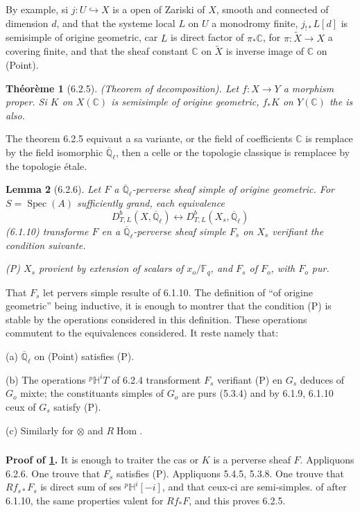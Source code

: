 \documentclass[12pt,a4paper]{article}
\theoremstyle{plain}
\newtheorem{theorem}{Th\'eor\`eme}[section]
\newtheorem{lemma}[theorem]{Lemma}
\theoremstyle{definition}
\theoremstyle{remark}
\DeclareMathOperator{\Hom}{Hom}
\DeclareMathOperator{\Spec}{Spec}
\newcommand{\CC}{\mathbb{C}}
\newcommand{\FF}{\mathbb{F}}
\newcommand{\HH}{\mathbb{H}}
\newcommand{\QQ}{\mathbb{Q}}
\begin{document}
By example, si $j: U \hookrightarrow X$ is a open of Zariski of $X$, smooth and connected of dimension $d$, and that the systeme local $L$ on $U$ a monodromy finite, $j_{!*}L[d]$ is semisimple of origine geometric, car $L$ is direct factor of $\pi_*\CC$, for $\pi: \tilde{X} \to X$ a covering finite, and that the sheaf constant $\CC$ on $\tilde{X}$ is inverse image of $\CC$ on (Point).

\begin{theorem}[6.2.5]\label{thm:6.2.5}(Theorem of decomposition).
Let $f: X \to Y$ a morphism proper. Si $K$ on $X(\CC)$ is semisimple of origine geometric, $f_*K$ on $Y(\CC)$ the is also.
\end{theorem}

The theorem 6.2.5 equivaut a sa variante, or the field of coefficients $\CC$ is remplace by the field isomorphic $\overline{\QQ}_{\ell}$, then a celle or the topologie classique is remplacee by the topologie étale.

\begin{lemma}[6.2.6]
Let $F$ a $\overline{\QQ}_{\ell}$-perverse sheaf simple of origine geometric. For $S = \Spec(A)$ sufficiently grand, each equivalence
\[
D^b_{T, L}(X, \overline{\QQ}_{\ell}) \longleftrightarrow D^b_{T, L}(X_s, \overline{\QQ}_{\ell})
\]
(6.1.10) transforme $F$ en a $\overline{\QQ}_{\ell}$-perverse sheaf simple $F_s$ on $X_s$ verifiant the condition suivante.

\emph{(P)} $X_s$ provient by extension of scalars of $x_o/\FF_q$, and $F_s$ of $F_o$, with $F_o$ pur.
\end{lemma}

That $F_s$ let pervers simple resulte of 6.1.10. The definition of ``of origine geometric'' being inductive, it is enough to montrer that the condition (P) is stable by the operations considered in this definition. These operations commutent to the equivalences considered. It reste namely that:

(a) $\overline{\QQ}_{\ell}$ on (Point) satisfies (P).

(b) The operations ${}^{p}\HH^iT$ of 6.2.4 transforment $F_s$ verifiant (P) en $G_s$ deduces of $G_o$ mixte; the constituants simples of $G_o$ are purs (5.3.4) and by 6.1.9, 6.1.10 ceux of $G_s$ satisfy (P).

(c) Similarly for $\otimes$ and $R\Hom$.

\subsubsection{}
\textbf{Proof of \ref{thm:6.2.5}.} It is enough to traiter the cas or $K$ is a perverse sheaf $F$. Appliquons 6.2.6. One trouve that $F_s$ satisfies (P). Appliquons 5.4.5, 5.3.8. One trouve that $Rf_{s*}F_s$ is direct sum of ses ${}^{p}\HH^i[-i]$, and that ceux-ci are semi-simples. of after 6.1.10, the same properties valent for $Rf_*F$, and this proves 6.2.5.
\end{document}
